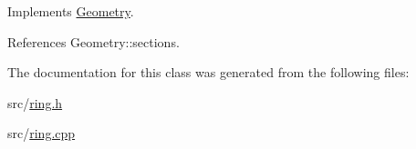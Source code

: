 Implements \hyperlink{classGeometry_aab2d4db916d7c8541af6624a82b2d4df}{Geometry}.



References Geometry\-::sections.



The documentation for this class was generated from the following files\-:\begin{DoxyCompactItemize}
\item 
src/\hyperlink{ring_8h}{ring.\-h}\item 
src/\hyperlink{ring_8cpp}{ring.\-cpp}\end{DoxyCompactItemize}
